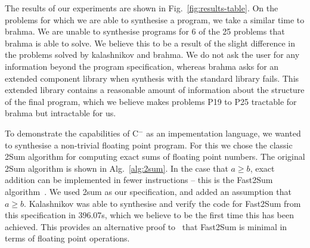 \documentclass[a4paper]{llncs}
\newcommand{\newC}{C$^-$\xspace}
\begin{document}
The results of our experiments are shown in Fig.~\ref{fig:results-table}.  On the problems for which
we are able to synthesise a program, we take a similar time to {\sc brahma}.  We are unable to synthesise
programs for 6 of the 25 problems that {\sc brahma} is able to solve.  We believe this to be a result of
the slight difference in the problems solved by {\sc kalashnikov} and {\sc brahma}.  We do not ask the
user for any information beyond the program specification, whereas {\sc brahma} asks for an extended
component library when synthesis with the standard library fails.  This extended library contains a
reasonable amount of information about the structure of the final program, which we believe makes
problems P19 to P25 tractable for {\sc brahma} but intractable for us.

To demonstrate the capabilities of \newC as an impementation language, we wanted to synthesise a
non-trivial floating point program.  For this we chose the classic {\sc 2Sum} algorithm for computing
exact sums of floating point numbers.  The original {\sc 2Sum} algorithm is shown in Alg.~\ref{alg:2sum}.
In the case that $a \ge b$, exact addition can be implemented in fewer instructions -- this is the
{\sc Fast2Sum} algorithm~\cite{fast2sum}.  We used {\sc 2sum} as our specification, and
added an assumption that $a \ge b$.  {\sc Kalashnikov} was able to synthesise and verify the
code for {\sc Fast2Sum} from this specification in 396.07s, which we believe to be the first time
this has been achieved.  This provides an alternative proof to~\cite{fast2sum} that {\sc Fast2Sum} is
minimal in terms of floating point operations.
\end{document}
